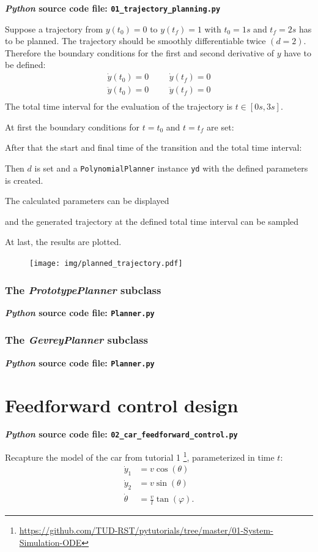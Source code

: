 \documentclass[a4paper,11pt,headings=standardclasses,parskip=half]{scrartcl}
\newcommand{\listcode}[3]{}
\newcommand{\listcodeplanning}[2]{\listcode{#1}{#2}{../sim/01_trajectory_planning.py}}
\newcommand{\py}{\emph{Python}\xspace}
\begin{document}
\textbf{\py source code file: \texttt{01\_trajectory\_planning.py}}

Suppose a trajectory from $y(t_0)=0$ to $y(t_f) = 1$ with $t_0=1s$ and $t_f = 2s$ has to be planned. The trajectory should be smoothly differentiable twice $(d=2)$. Therefore the boundary conditions for the first and second derivative of $y$ have to be defined: 
\begin{align*}
\dot{y}(t_0)=0 &&& \dot{y}(t_f)=0 \\
\ddot{y}(t_0)=0 &&& \ddot{y}(t_f)=0 \\
\end{align*}
The total time interval for the evaluation of the trajectory is $t\in[0s,3s]$.

At first the boundary conditions for $t=t_0$ and $t=t_f$ are set:
\listcodeplanning{7}{8}
After that the start and final time of the transition and the total time interval:
\listcodeplanning{9}{11}
Then $d$ is set and a \texttt{PolynomialPlanner} instance \texttt{yd} with the defined parameters is created.
\listcodeplanning{12}{13}
The calculated parameters can be displayed
\listcodeplanning{15}{16}
and the generated trajectory at the defined total time interval can be sampled
\listcodeplanning{18}{19}
At last, the results are plotted.
\listcodeplanning{21}{27}
\begin{figure}[ht]
\centering
\texttt{[image: img/planned\_trajectory.pdf]}
\end{figure}
\subsubsection{The \emph{PrototypePlanner} subclass}
\textbf{\py source code file: \texttt{Planner.py}}
\subsubsection{The \emph{GevreyPlanner} subclass}
\textbf{\py source code file: \texttt{Planner.py}}
\newpage
\section{Feedforward control design}
\label{sec:ffcontrol}
\textbf{\py source code file: \texttt{02\_car\_feedforward\_control.py}}

Recapture the model of the car from tutorial 1 \footnote{\url{https://github.com/TUD-RST/pytutorials/tree/master/01-System-Simulation-ODE}}, parameterized in time $t$:
\begin{subequations}
\begin{align}
\dot y_1 &= v \cos(\theta)\\
\dot y_2 &= v \sin(\theta)\\
\dot \theta &= \frac{v}{l}\tan(\varphi).
\end{align}
\end{subequations}
\end{document}
